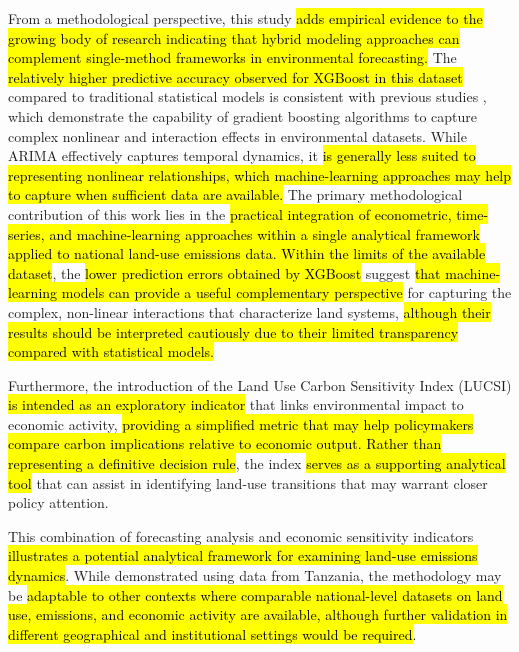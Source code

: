 \documentclass[10pt,letterpaper]{article}
\begin{document}
From a methodological perspective, this study \hl{adds empirical evidence to the growing body of research indicating that hybrid modeling approaches can complement single-method frameworks in environmental forecasting.} The \hl{relatively higher predictive accuracy observed for XGBoost in this dataset} compared to traditional statistical models is consistent with previous studies \cite{chen2019extreme, gelete2023hybrid}, which demonstrate the capability of gradient boosting algorithms to capture complex nonlinear and interaction effects in environmental datasets. While ARIMA effectively captures temporal dynamics, it \hl{is generally less suited to representing nonlinear relationships, which machine-learning approaches may help to capture when sufficient data are available.} 
The primary methodological contribution of this work lies in the \hl{practical integration of econometric, time-series, and machine-learning approaches within a single analytical framework applied to national land-use emissions data. Within the limits of the available dataset}, the \hl{lower prediction errors obtained by XGBoost} suggest \hl{that machine-learning models can provide a useful complementary perspective} for capturing the complex, non-linear interactions that characterize land systems, \hl{although their results should be interpreted cautiously due to their limited transparency compared with statistical models.}

Furthermore, the introduction of the Land Use Carbon Sensitivity Index (LUCSI) \hl{is intended as an exploratory indicator} that links environmental impact to economic activity, \hl{providing a simplified metric that may help policymakers compare carbon implications relative to economic output. Rather than representing a definitive decision rule}, the index \hl{serves as a supporting analytical tool} that can assist in identifying land-use transitions that may warrant closer policy attention.

This combination of forecasting analysis and economic sensitivity indicators \hl{illustrates a potential analytical framework for examining land-use emissions dynamics}. While demonstrated using data from Tanzania, the methodology may be \hl{adaptable to other contexts where comparable national-level datasets on land use, emissions, and economic activity are available, although further validation in different geographical and institutional settings would be required}.
\end{document}
